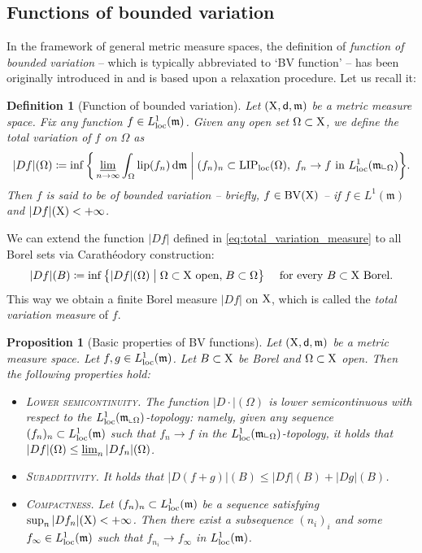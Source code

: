\documentclass[reqno]{amsart}
\numberwithin{equation}{section}
\newcommand{\X}{{\rm X}}
\newcommand{\sfd}{{\sf d}}
\newcommand{\mm}{\mathfrak m}
\renewcommand{\d}{{\mathrm d}}
\newcommand{\1}{\mathbbm 1}
\newcommand{\limi}{\varliminf}
\newcommand{\LIP}{{\rm LIP}}
\newcommand{\lip}{{\rm lip}}
\newcommand{\loc}{{\rm loc}}
\newcommand{\BV}{{\rm BV}}
\newtheorem{proposition}[theorem]{Proposition}
\newtheorem{definition}[theorem]{Definition}
\begin{document}
\subsection{Functions of bounded variation}
%
%
In the framework of general metric measure spaces, the definition of
\emph{function of bounded variation} -- which is typically abbreviated
to `BV function' -- has been originally introduced in \cite{Miranda03}
and is based upon a relaxation procedure. Let us recall it:
%
%
\begin{definition}[Function of bounded variation]
Let \((\X,\sfd,\mm)\) be a metric measure space. Fix any function
\(f\in L^1_\loc(\mm)\). Given any open set \(\Omega\subset\X\), we define
the \emph{total variation of \(f\) on \(\Omega\)} as
\begin{equation}\label{eq:total_variation_measure}
|Df|(\Omega)\coloneqq\inf\bigg\{\limi_{n\to\infty}\int_\Omega\lip(f_n)\,\d\mm
\;\bigg|\;(f_n)_n\subset\LIP_\loc(\Omega),\;f_n\to f
\text{ in }L^1_\loc(\mm\llcorner_\Omega)\bigg\}.
\end{equation}
Then \(f\) is said to be \emph{of bounded variation} -- briefly,
\(f\in\BV(\X)\) -- if \(f\in L^1(\mm)\) and \(|Df|(\X)<+\infty\).
\end{definition}
%
%
We can extend the function \(|Df|\) defined in \eqref{eq:total_variation_measure}
to all Borel sets via Carath\'{e}odory construction:
\[
|Df|(B)\coloneqq\inf\big\{|Df|(\Omega)\;\big|
\;\Omega\subset\X\text{ open,}\;B\subset \Omega\big\}
\quad\text{ for every }B\subset\X\text{ Borel.}
\]
This way we obtain a finite Borel measure \(|Df|\) on \(\X\),
which is called the \emph{total variation measure} of \(f\).
%
%
\begin{proposition}[Basic properties of BV functions]
\label{prop:properties_BV_functions}
Let \((\X,\sfd,\mm)\) be a metric measure space. Let \(f,g\in L^1_\loc(\mm)\).
Let \(B\subset\X\) be Borel and \(\Omega\subset\X\) open.
Then the following properties hold:
\begin{itemize}
\item[\(\rm i)\)] \textsc{Lower semicontinuity.} The function \(|D\cdot|(\Omega)\)
is lower semicontinuous with respect to the \(L^1_\loc(\mm_{\llcorner\Omega})\)-topology:
namely, given any sequence \((f_n)_n\subset L^1_\loc(\mm)\) such that \(f_n\to f\)
in the \(L^1_\loc(\mm\llcorner_\Omega)\)-topology, it holds that
\(|Df|(\Omega)\leq\limi_n|Df_n|(\Omega)\).
\item[\(\rm ii)\)] \textsc{Subadditivity.} It holds that
\(\big|D(f+g)\big|(B)\leq|Df|(B)+|Dg|(B)\).
\item[\(\rm iii)\)] \textsc{Compactness.} Let \((f_n)_n\subset L^1_\loc(\mm)\)
be a sequence satisfying \(\sup_n|Df_n|(\X)<+\infty\). Then there exist a
subsequence \((n_i)_i\) and some \(f_\infty\in L^1_\loc(\mm)\) such that
\(f_{n_i}\to f_\infty\) in \(L^1_\loc(\mm)\).
\end{itemize}
\end{proposition}
\end{document}

